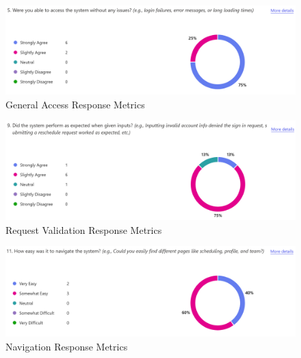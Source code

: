 \documentclass{article}
\begin{document}
    \begin{figure}[H]
    \centering
    \includegraphics[scale=0.6]{survey_responses_access.png}
    \caption{General Access Response Metrics}
    \label{access}
    \end{figure}
    
    \begin{figure}[H]
    \centering
    \includegraphics[scale=0.6]{survey_responses_validate_inputs.png}
    \caption{Request Validation Response Metrics}
    \label{validate}
    \end{figure}

    \begin{figure}[H]
    \centering
    \includegraphics[scale=0.6]{survey_responses_navigation.png}
    \caption{Navigation Response Metrics}
    \label{nav}
    \end{figure}
\end{document}
